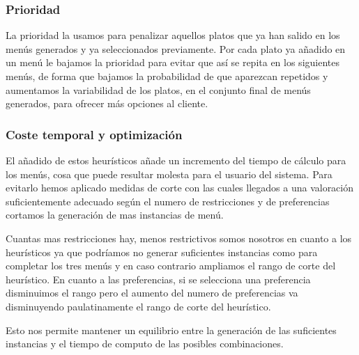 \documentclass{article}
\begin{document}
\subsubsection{Prioridad}
La prioridad la usamos para penalizar aquellos platos que ya han salido en los menús generados y ya seleccionados previamente. Por cada plato ya añadido en un menú le bajamos la prioridad para evitar que así se repita en los siguientes menús, de forma que bajamos la probabilidad de que aparezcan repetidos y aumentamos la variabilidad de los platos, en el conjunto final de menús generados, para ofrecer más opciones al cliente.

\subsubsection{Coste temporal y optimización}
El añadido de estos heurísticos añade un incremento del tiempo de cálculo para los menús, cosa que puede resultar molesta para el usuario del sistema. Para evitarlo hemos aplicado medidas de corte con las cuales llegados a una valoración suficientemente adecuado según el numero de restricciones y de preferencias cortamos la generación de mas instancias de menú.
\par
Cuantas mas restricciones hay, menos restrictivos somos nosotros en cuanto a los heurísticos ya que podríamos no generar suficientes instancias como para completar los tres menús y en caso contrario ampliamos el rango de corte del heurístico. En cuanto a las preferencias, si se selecciona una preferencia disminuimos el rango pero el aumento del numero de preferencias va disminuyendo paulatinamente el rango de corte del heurístico.
\par
Esto nos permite mantener un equilibrio entre la generación de las suficientes instancias y el tiempo de computo de las posibles combinaciones.
\end{document}
